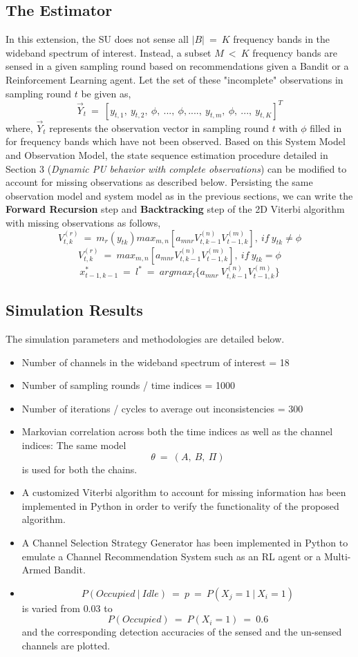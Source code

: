 \documentclass[12pt, draftcls, onecolumn]{IEEEtran}
\begin{document}
\subsection{The Estimator}
In this extension, the SU does not sense all $|B|\ =\ K$ frequency bands in the wideband spectrum of interest. Instead, a subset $M\ <\ K$ frequency bands are sensed in a given sampling round based on recommendations given a Bandit or a Reinforcement Learning agent. Let the set of these "incomplete" observations in sampling round $t$ be given as,
\[\vec{Y}_t\ =\ [y_{t,1},\ y_{t,2},\ \phi,\ ...,\ \phi,....,\ y_{t,m},\ \phi,\ ...,\ y_{t,K}]^T\]
where, $\vec{Y}_t$ represents the observation vector in sampling round $t$ with $\phi$ filled in for frequency bands which have not been observed.
Based on this System Model and Observation Model, the state sequence estimation procedure detailed in Section 3 (\textit{Dynamic PU behavior with complete observations}) can be modified to account for missing observations as described below.
Persisting the same observation model and system model as in the previous sections, we can write the \textbf{Forward Recursion} step and \textbf{Backtracking} step of the 2D Viterbi algorithm with missing observations as follows,
\[V_{t,k}^{(r)}\ =\ m_r(y_{tk})max_{m,n}[a_{mnr}V_{t,k-1}^{(n)}V_{t-1,k}^{(m)}],\ if\ y_{tk}\neq\phi\]
\[V_{t,k}^{(r)}\ =\ max_{m,n}[a_{mnr}V_{t,k-1}^{(n)}V_{t-1,k}^{(m)}],\ if\ y_{tk}=\phi\]
\[x_{t-1,k-1}^*\ =\ l^*\ =\ argmax_{l}\{a_{mnr}\ V_{t,k-1}^{(n)}V_{t-1,k}^{(m)}\}\]
\subsection{Simulation Results}
The simulation parameters and methodologies are detailed below.
\begin{itemize}
    \item Number of channels in the wideband spectrum of interest = 18
    \item Number of sampling rounds / time indices = 1000
    \item Number of iterations / cycles to average out inconsistencies = 300
    \item Markovian correlation across both the time indices as well as the channel indices: The same model \[\theta\ =\ (A,\ B,\ \Pi)\] is used for both the chains.
    \item A customized Viterbi algorithm to account for missing information has been implemented in Python in order to verify the functionality of the proposed algorithm.
    \item A Channel Selection Strategy Generator has been implemented in Python to emulate a Channel Recommendation System such as an RL agent or a Multi-Armed Bandit.
    \item \[P(Occupied\ |\ Idle)\ =\ p\ =\ P(X_j=1\ |\ X_i=1)\] is varied from $0.03$ to \[P(Occupied)\ =\ P(X_i=1)\ =\ 0.6\] and the corresponding detection accuracies of the sensed and the un-sensed channels are plotted.
\end{itemize}
\end{document}
